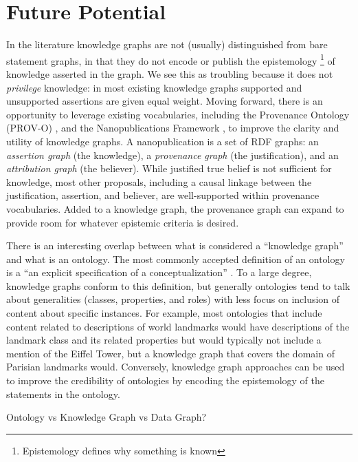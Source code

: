 \section{Future Potential}

In the literature knowledge graphs are not (usually) distinguished from bare statement graphs, in that they do not encode or publish the epistemology \footnote{Epistemology defines why something is known} of knowledge asserted in the graph.
We see this as troubling because it does not {\em privilege} knowledge: in most existing knowledge graphs supported and unsupported assertions are given equal weight.
Moving forward, there is an opportunity to leverage existing vocabularies, including the Provenance Ontology (PROV-O) \cite{Moreau_2015}, and the Nanopublications Framework \cite{groth2010anatomy}, to improve the clarity and utility of knowledge graphs.
A nanopublication is a set of RDF graphs: an {\em assertion graph} (the knowledge), a {\em provenance graph} (the justification), and an {\em attribution graph} (the believer).
While justified true belief is not sufficient for knowledge, most other proposals, including a causal linkage between the justification, assertion, and believer, are well-supported within provenance vocabularies.
Added to a knowledge graph, the provenance graph can expand to provide room for whatever epistemic criteria is desired.

There is an interesting overlap between what is considered a ``knowledge graph'' and what is an ontology.
The most commonly accepted definition of an ontology is a ``an explicit specification of a conceptualization'' \cite{Gruber_1993}.
To a large degree, knowledge graphs conform to this definition, but generally ontologies tend to talk about generalities (classes, properties, and roles) with less focus on inclusion of content about specific instances.
For example, most ontologies that include content related to descriptions of world landmarks would have descriptions of the landmark class and its related properties but would typically not include a mention of the Eiffel Tower, but a knowledge graph that covers the domain of Parisian landmarks would.
Conversely, knowledge graph approaches can be used to improve the credibility of ontologies by encoding the epistemology of the statements in the ontology.


Ontology vs Knowledge Graph vs Data Graph?